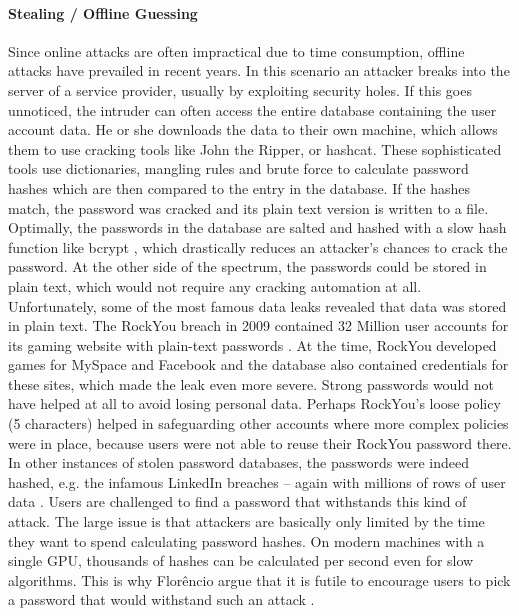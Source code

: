\paragraph{Stealing / Offline Guessing} Since online attacks are often impractical due to time consumption, offline attacks have prevailed in recent years. 
In this scenario an attacker breaks into the server of a service provider, usually by exploiting security holes. If this goes unnoticed, the intruder can often access the entire database containing the user account data. He or she downloads the data to their own machine, which allows them to use cracking tools like John the Ripper, or hashcat. These sophisticated tools use dictionaries, mangling rules and brute force to calculate password hashes which are then compared to the entry in the database. If the hashes match, the password was cracked and its plain text version is written to a file. 
Optimally, the passwords in the database are salted and hashed with a slow hash function like bcrypt \cite{Provos1999bcrypt}, which drastically reduces an attacker's chances to crack the password. At the other side of the spectrum, the passwords could be stored in plain text, which would not require any cracking automation at all. Unfortunately, some of the most famous data leaks revealed that data was stored in plain text. 
The RockYou breach in 2009 contained 32 Million user accounts for its gaming website with plain-text passwords \cite{Bonneau2012ScienceOfGuessing, Weir2010MetricsPolicies}. At the time, RockYou developed games for MySpace and Facebook and the database also contained credentials for these sites, which made the leak even more severe. Strong passwords would not have helped at all to avoid losing personal data. Perhaps RockYou's loose policy (5 characters) helped in safeguarding other accounts where more complex policies were in place, because users were not able to reuse their RockYou password there. 
In other instances of stolen password databases, the passwords were indeed hashed, e.g. the infamous LinkedIn breaches -- again with millions of rows of user data \cite{Huh2017TooBusy}. 
Users are challenged to find a password that withstands this kind of attack. The large issue is that attackers are basically only limited by the time they want to spend calculating password hashes. On modern machines with a single GPU, thousands of hashes can be calculated per second even for slow algorithms. This is why Florêncio \etal argue that it is futile to encourage users to pick a password that would withstand such an attack \cite{Florencio2014AdministratorsGuide, Florencio2016CommACM}. 

